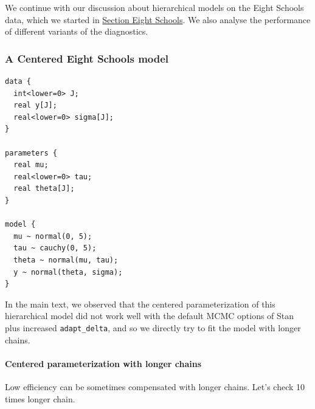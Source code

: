\documentclass[american,]{article}
\let\oldparagraph\paragraph
\renewcommand{\paragraph}[1]{\oldparagraph{#1}\mbox{}}
\begin{document}
We continue with our discussion about hierarchical models on the Eight
Schools data, which we started in
\protect\hyperlink{eightschools}{Section Eight Schools}. We also analyse
the performance of different variants of the diagnostics.

\hypertarget{a-centered-eight-schools-model-1}{%
\subsubsection*{A Centered Eight Schools
model}\label{a-centered-eight-schools-model-1}}

\begin{verbatim}
data {
  int<lower=0> J;
  real y[J];
  real<lower=0> sigma[J];
}

parameters {
  real mu;
  real<lower=0> tau;
  real theta[J];
}

model {
  mu ~ normal(0, 5);
  tau ~ cauchy(0, 5);
  theta ~ normal(mu, tau);
  y ~ normal(theta, sigma);
}
\end{verbatim}

In the main text, we observed that the centered parameterization of this
hierarchical model did not work well with the default MCMC options of
Stan plus increased \texttt{adapt\_delta}, and so we directly try to fit
the model with longer chains.

\hypertarget{centered-parameterization-with-longer-chains}{%
\paragraph{Centered parameterization with longer
chains}\label{centered-parameterization-with-longer-chains}}

Low efficiency can be sometimes compensated with longer chains. Let's
check 10 times longer chain.
\end{document}
